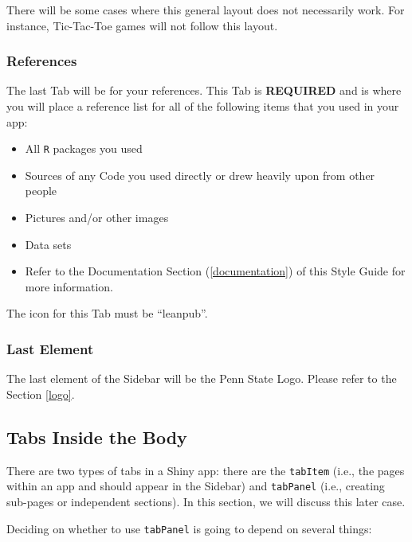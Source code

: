 \documentclass[
]{book}
\providecommand{\tightlist}{%
  \setlength{\itemsep}{0pt}\setlength{\parskip}{0pt}}
\begin{document}
There will be some cases where this general layout does not necessarily work. For instance, Tic-Tac-Toe games will not follow this layout.

\hypertarget{references}{%
\subsubsection{References}\label{references}}

The last Tab will be for your references. This Tab is \textbf{REQUIRED} and is where you will place a reference list for all of the following items that you used in your app:

\begin{itemize}
\tightlist
\item
  All \texttt{R} packages you used
\item
  Sources of any Code you used directly or drew heavily upon from other people
\item
  Pictures and/or other images
\item
  Data sets
\item
  Refer to the Documentation Section (\ref{documentation}) of this Style Guide for more information.
\end{itemize}

The icon for this Tab must be ``leanpub''.

\hypertarget{last-element}{%
\subsubsection{Last Element}\label{last-element}}

The last element of the Sidebar will be the Penn State Logo. Please refer to the Section \ref{logo}.

\hypertarget{tabs-inside-the-body}{%
\subsection{Tabs Inside the Body}\label{tabs-inside-the-body}}

There are two types of tabs in a Shiny app: there are the \texttt{tabItem} (i.e., the pages within an app and should appear in the Sidebar) and \texttt{tabPanel} (i.e., creating sub-pages or independent sections). In this section, we will discuss this later case.

Deciding on whether to use \texttt{tabPanel} is going to depend on several things:
\end{document}

